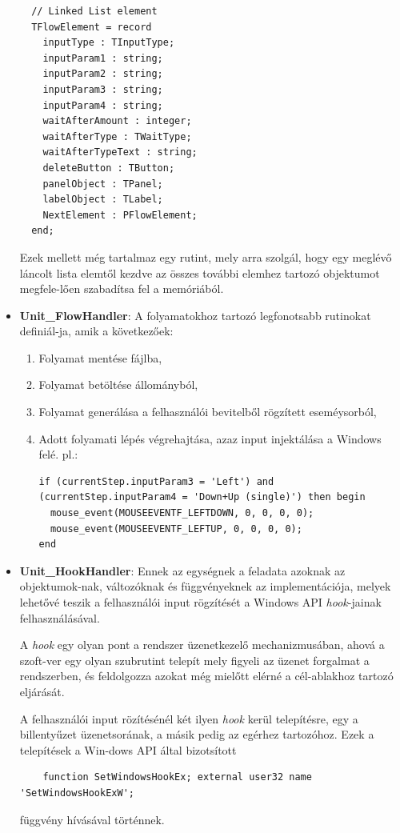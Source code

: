 \begin{itemize}
{\begin{lstlisting}
  // Linked List element
  TFlowElement = record
    inputType : TInputType;
    inputParam1 : string;
    inputParam2 : string;
    inputParam3 : string;
    inputParam4 : string;
    waitAfterAmount : integer;
    waitAfterType : TWaitType;
    waitAfterTypeText : string;
    deleteButton : TButton;
    panelObject : TPanel;
    labelObject : TLabel;
    NextElement : PFlowElement;
  end;
	\end{lstlisting}

	Ezek mellett még tartalmaz egy rutint, mely arra szolgál, hogy egy meglévő láncolt lista elemtől kezdve az összes további elemhez tartozó objektumot megfele\hyp{}lően szabadítsa fel a memóriából.

	}
	\item{
		\textbf{Unit\_FlowHandler}: A folyamatokhoz tartozó legfonotsabb rutinokat definiál\hyp{}ja, amik a következőek:
		\begin{enumerate}
			\item{Folyamat mentése fájlba,}
			\item{Folyamat betöltése állományból,}
			\item{Folyamat generálása a felhasználói bevitelből rögzített eseméysorból,}
			\item{Adott folyamati lépés végrehajtása, azaz input injektálása a Windows felé. pl.:
				\begin{lstlisting}
if (currentStep.inputParam3 = 'Left') and (currentStep.inputParam4 = 'Down+Up (single)') then begin
  mouse_event(MOUSEEVENTF_LEFTDOWN, 0, 0, 0, 0);
  mouse_event(MOUSEEVENTF_LEFTUP, 0, 0, 0, 0);
end 
				\end{lstlisting}
			} 
			
		\end{enumerate}
	}
	\item{
		\textbf{Unit\_HookHandler}: Ennek az egységnek a feladata azoknak az objektumok\hyp{}nak, változóknak és függvényeknek az implementációja, melyek lehetővé teszik a felhasználói input rögzítését a Windows API \textit{hook}-jainak felhasználásával.

A \textit{hook} egy olyan pont a rendszer üzenetkezelő mechanizmusában, ahová a szoft\hyp{}ver egy olyan szubrutint telepít mely figyeli az üzenet forgalmat a rendszerben, és feldolgozza azokat még mielőtt elérné a cél-ablakhoz tartozó eljárását.

A felhasználói input rözítésénél két ilyen \textit{hook} kerül telepítésre, egy a billentyűzet üzenetsorának, a másik pedig az egérhez tartozóhoz. Ezek a telepítések a Win\hyp{}dows API által bizotsított
\begin{lstlisting}
	function SetWindowsHookEx; external user32 name 'SetWindowsHookExW';
\end{lstlisting}
függvény hívásával történnek.

}
\end{itemize}
